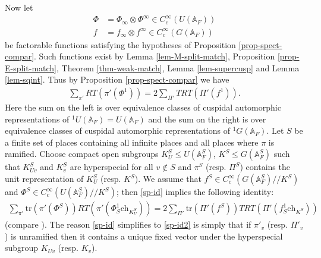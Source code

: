 \documentclass[12pt]{amsart}
\theoremstyle{remark}
\numberwithin{equation}{section}
\newcommand{\A}{\mathbb{A}}
\theoremstyle{definition}
\numberwithin{equation}{subsection}
\begin{document}
Now let
\begin{align*}
\Phi&=\Phi_{\infty} \otimes \Phi^{\infty} \in C_c^{\infty}(U(\A_F))\\
f&=f_{\infty} \otimes f^{\infty} \in C_c^{\infty}(G(\A_F))
\end{align*}
be factorable functions satisfying the hypotheses of Proposition \ref{prop-spect-compar}.  Such functions exist
by Lemma \ref{lem-M-split-match}, Proposition \ref{prop-E-split-match}, Theorem \ref{thm-weak-match}, Lemma \ref{lem-supercusp} and Lemma \ref{lem-sqint}.
Thus by Proposition \ref{prop-spect-compar} we have
\begin{align} \label{sp-id}
\sum_{\pi'} RT(\pi'(\Phi^1))
=2\sum_{\Pi'} TRT(\Pi'(f^1)).
\end{align}
 Here the sum on the left is over equivalence classes of cuspidal automorphic representations of ${}^1U(\A_F)=U(\A_F)$ and the sum on the right is over equivalence classes of cuspidal automorphic representations of ${}^1G(\A_F)$.  Let $S$ be a finite set of places containing all infinite places and all places where $\pi$ is ramified.  Choose compact open subgroups $K_U^{S} \leq U(\A_F^{S})$, $K^S \leq G(\A_F^S)$ such that $K^S_{Uv}$ and $K_v^S$ are hyperspecial for all $v \not \in S$ and $\pi^S$ (resp. $\Pi^S$) contains the unit representation of $K^S_U$ (resp. $K^S$).  We assume that $f^S \in C_c^{\infty}(G(\A_{F}^S)//K^S)$ and $\Phi^S \in C_c^{\infty}(U(\A_F^S)//K^S)$; then \eqref{sp-id} implies the following identity:
\begin{align} \label{sp-id2}
\sum_{\pi'} \mathrm{tr}(\pi'(\Phi^S))RT(\pi'(\Phi^1_S\mathrm{ch}_{K^S_U}))=
2\sum_{\Pi'} \mathrm{tr}(\Pi'(f^S))TRT(\Pi'(f^1_S\mathrm{ch}_{K^S}))
\end{align}
(compare \cite[\S 3(2)]{JacquetLai}).  The reason \eqref{sp-id} simplifies to \eqref{sp-id2} is simply that if $\pi'_v$ (resp. $\Pi'_v$) is unramified then it contains a unique fixed vector under the hyperspecial subgroup $K_{Uv}$ (resp. $K_v$).
\end{document}
